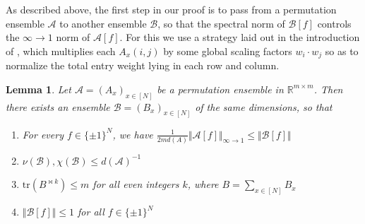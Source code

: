 \documentclass[11pt]{article}
\newtheorem{lemma}{Lemma}
\newcommand{\norm}[1]{\Vert #1 \Vert}
\newcommand{\N}{[N]}
\begin{document}
As described above, the first step in our proof is to pass from a permutation ensemble $\mathcal{A}$ to another ensemble $\mathcal{B}$, so that the spectral norm of $\mathcal{B}[f]$ controls the $\infty\to 1$ norm of $\mathcal{A}[f]$. For this we use a strategy laid out in the introduction of \cite{simpler-moore}, which multiplies each $A_x(i,j)$ by some global scaling factors $w_i \cdot w_j$ so as to normalize the total entry weight lying in each row and column. 
\begin{lemma}\label{lem:infty-to-spectral}
Let $\mathcal{A}=(A_x)_{x \in \N}$ be a permutation ensemble in $\mathbb{R}^{m \times m}$. Then there exists an ensemble $\mathcal{B}=(B_x)_{x \in \N}$ of the same dimensions, so that
\begin{enumerate}
	\item For every $f \in \{\pm 1\}^N$, we have $\frac{1}{2md(A)}\norm{\mathcal{A}[f]}_{\infty \to 1} \leq \norm{\mathcal{B}[f]} $
	\item $\nu(\mathcal{B}),\chi(\mathcal{B}) \leq d(\mathcal{A})^{-1}$
	\item $\mathrm{tr}(B^{\bowtie k}) \leq m$ for all even integers $k$, where $B = \sum_{x \in \N} B_x$
	\item $\norm{\mathcal{B}[f]} \leq 1$ for all $f\in \{\pm 1\}^N$
\end{enumerate}
\end{lemma}
\end{document}
